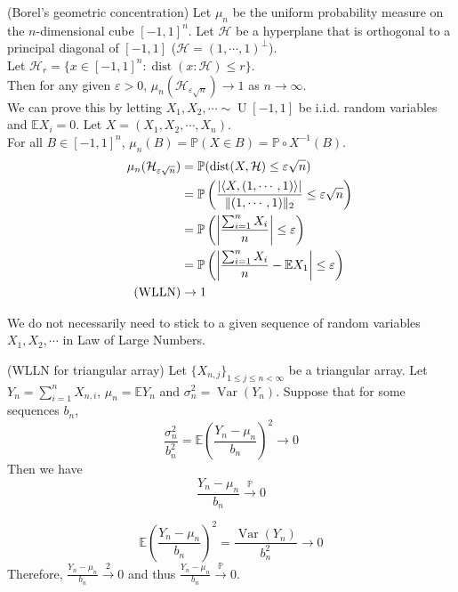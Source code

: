 \documentclass{huhtakm-template-book}
\newcommand{\prob}{\mathbb{P}}
\newcommand{\expect}{\mathbb{E}}
\DeclareMathOperator{\U}{U}
\DeclareMathOperator{\Var}{Var}
\DeclareMathOperator{\dist}{dist}
\begin{document}
\begin{eg}(Borel's geometric concentration)
	Let $\mu_{n}$ be the uniform probability measure on the $n$-dimensional cube $[-1,1]^{n}$. Let $\mathcal{H}$ be a hyperplane that is orthogonal to a principal diagonal of $[-1,1]$ ($\mathcal{H}=(1,\cdots,1)^{\perp}$).\\
	Let $\mathcal{H}_{r}=\{x\in[-1,1]^{n}:\dist(x:\mathcal{H})\leq r\}$.\\
	Then for any given $\varepsilon>0$, $\mu_{n}(\mathcal{H}_{\varepsilon\sqrt{n}})\to 1$ as $n\to\infty$.\\
	We can prove this by letting $X_{1},X_{2},\cdots\sim\U[-1,1]$ be i.i.d. random variables and $\expect X_{i}=0$. Let $X=(X_{1},X_{2},\cdots,X_{n})$.\\
	For all $B\in[-1,1]^{n}$, $\mu_{n}(B)=\prob(X\in B)=\prob\circ X^{-1}(B)$.
	\begin{align*}
		\mu_{n}(\mathcal{H}_{\varepsilon\sqrt{n}})&=\prob(\dist(X,\mathcal{H})\leq\varepsilon\sqrt{n})\\
		&=\prob\left(\frac{\abs{\left<X,(1,\cdots,1)\right>}}{\norm{(1,\cdots,1)}_{2}}\leq\varepsilon\sqrt{n}\right)\\
		&=\prob\left(\abs{\frac{\sum_{i=1}^{n}X_{i}}{n}}\leq\varepsilon\right)\\
		&=\prob\left(\abs{\frac{\sum_{i=1}^{n}X_{i}}{n}-\expect X_{1}}\leq\varepsilon\right)\\
		\tag{WLLN}
		&\to 1
	\end{align*}
\end{eg}
We do not necessarily need to stick to a given sequence of random variables $X_{1},X_{2},\cdots$ in Law of Large Numbers.
\begin{thm}(WLLN for triangular array)
	Let $\{X_{n,j}\}_{1\leq j\leq n<\infty}$ be a triangular array. Let $Y_{n}=\sum_{i=1}^{n}X_{n,i}$, $\mu_{n}=\expect Y_{n}$ and $\sigma_{n}^{2}=\Var(Y_{n})$. Suppose that for some sequences $b_{n}$,
	\begin{equation*}
		\frac{\sigma_{n}^{2}}{b_{n}^{2}}=\expect\left(\frac{Y_{n}-\mu_{n}}{b_{n}}\right)^{2}\to 0
	\end{equation*}
	Then we have
	\begin{equation*}
		\frac{Y_{n}-\mu_{n}}{b_{n}}\xrightarrow{\prob}0
	\end{equation*}
\end{thm}
\begin{proofing}
	\begin{equation*}
		\expect\left(\frac{Y_{n}-\mu_{n}}{b_{n}}\right)^{2}=\frac{\Var(Y_{n})}{b_{n}^{2}}\to 0
	\end{equation*}
	Therefore, $\frac{Y_{n}-\mu_{n}}{b_{n}}\xrightarrow{2}0$ and thus $\frac{Y_{n}-\mu_{n}}{b_{n}}\xrightarrow{\prob}0$.
\end{proofing}
\end{document}
